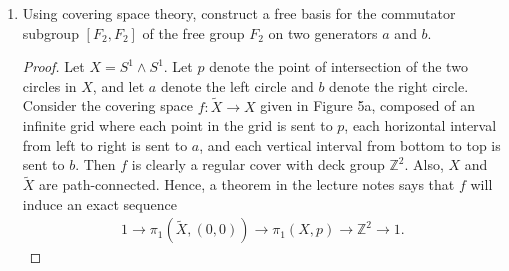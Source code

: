 \documentclass{article}
\begin{document}
\begin{enumerate}[label={\bf Q\arabic*:}]
    \begin{proof}
      Assume by contradiction that $f$ is not finite-sheeted. Define an
      open cover $\mathcal{O}$ of $\widetilde{X}$ by the set of all sheets
      lying above each point $x$ in $X$, i.e.
      \begin{equation*}
        \mathcal{O} := \bigcup_{x\in X}
          \{\widetilde{U}_{\alpha,x}:\alpha\in A\}.
      \end{equation*}
      From compactness of $\widetilde{X}$, $\mathcal{O}$ contains a finite
      sub-cover $\mathcal{U}\subset\mathcal{O}$. Write $\mathcal{U}$ as
      \begin{equation*}
        \mathcal{U} := \bigcup_{i=1}^n \widetilde{U}_{\alpha_i,x_i}.
      \end{equation*}
      Consider the sheets of $x_1$. Each sheet $\widetilde{U}_{\alpha,x_1}$
      of $x_1$ must be contained in some sheet in $\mathcal{U}$, which
      implies that the degree of $x_1$ is at most $n$. Since the degree of
      a cover is independent on the choice of $x\in X$, $f$ must have
      degree no more than $n$, a contradiction.
    \end{proof}

  \item Using covering space theory, construct a free basis for the
    commutator subgroup $[F_2,F_2]$ of the free group $F_2$ on two
    generators $a$ and $b$.

    \begin{proof}
      Let $X=S^1\wedge S^1$. Let $p$ denote the point of intersection of
      the two circles in $X$, and let $a$ denote the left circle and $b$
      denote the right circle. Consider the covering space
      $f:\widetilde{X}\rightarrow X$ given in Figure 5a, composed of an
      infinite grid where each point in the grid is sent to $p$, each
      horizontal interval from left to right is sent to $a$, and each
      vertical interval from bottom to top is sent to $b$. Then $f$ is
      clearly a regular cover with deck group $\mathbb{Z}^2$. Also, $X$ and
      $\widetilde{X}$ are path-connected. Hence, a theorem in the lecture
      notes says that $f$ will induce an exact sequence
      \begin{align*}
        1\rightarrow \pi_1(\widetilde{X},(0,0))\rightarrow
          \pi_1(X,p)\rightarrow \mathbb{Z}^2\rightarrow 1.
      \end{align*}
    \end{proof}
\end{enumerate}
\end{document}
